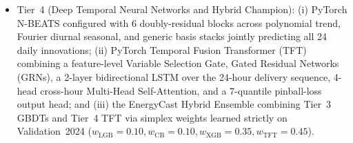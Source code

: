 \documentclass[runningheads,a4paper]{llncs}
\begin{document}
\begin{itemize}
\begin{equation}
\begin{aligned}
    \end{aligned}
    \label{eq:gbdt_gain}
    \end{equation}
    \item Tier~4 (Deep Temporal Neural Networks and Hybrid Champion): (i) PyTorch N-BEATS \cite{oreshkin2020nbeats} configured with 6 doubly-residual blocks across polynomial trend, Fourier diurnal seasonal, and generic basis stacks jointly predicting all 24 daily innovations; (ii) PyTorch Temporal Fusion Transformer (TFT) \cite{lim2021temporal} combining a feature-level Variable Selection Gate, Gated Residual Networks (GRNs), a 2-layer bidirectional LSTM over the 24-hour delivery sequence, 4-head cross-hour Multi-Head Self-Attention, and a 7-quantile pinball-loss output head; and (iii) the EnergyCast Hybrid Ensemble combining Tier~3 GBDTs and Tier~4 TFT via simplex weights learned strictly on Validation~2024 ($w_{\text{LGB}}=0.10, w_{\text{CB}}=0.10, w_{\text{XGB}}=0.35, w_{\text{TFT}}=0.45$).
\end{itemize}
\end{document}
